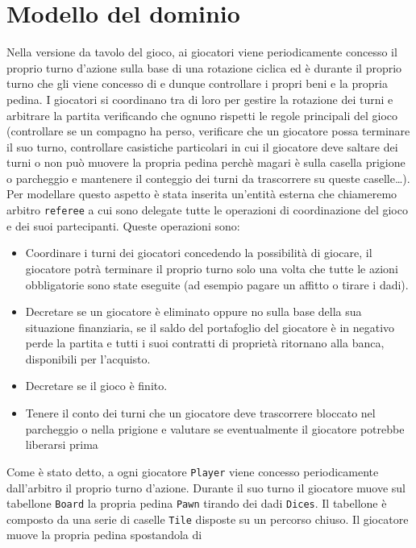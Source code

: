 \section{Modello del dominio}
Nella versione da tavolo del gioco, ai giocatori viene periodicamente concesso il proprio turno d'azione 
sulla base di una rotazione ciclica ed è durante il proprio turno che gli viene concesso di  e dunque
controllare i propri beni e la propria pedina.
I giocatori si coordinano tra di loro
per gestire la rotazione dei turni e arbitrare la partita verificando che ognuno rispetti le 
regole principali del gioco (controllare se un compagno ha perso, verificare che un giocatore possa terminare il suo turno, controllare casistiche particolari
in cui il giocatore deve saltare dei turni o non può muovere la propria pedina perchè magari è sulla casella prigione
o parcheggio e mantenere il conteggio dei turni da trascorrere su queste caselle\dots).\newline
Per modellare questo aspetto è stata inserita un'entità esterna che chiameremo arbitro \texttt{referee} a cui sono delegate
tutte le operazioni di coordinazione del gioco e dei suoi partecipanti. 
Queste operazioni sono:
\begin{itemize}
    \item
    Coordinare i turni dei giocatori concedendo la possibilità di giocare, 
    il giocatore potrà terminare il proprio turno solo una volta che tutte le azioni obbligatorie sono state eseguite 
    (ad esempio pagare un affitto o tirare i dadi).
    \item 
    Decretare se un giocatore è eliminato oppure no sulla base della sua situazione finanziaria,
    se il saldo del portafoglio del giocatore è in negativo perde la partita e tutti i suoi contratti di proprietà
    ritornano alla banca, disponibili per l’acquisto. 
    \item
    Decretare se il gioco è finito.
    \item Tenere il conto dei turni che un giocatore deve trascorrere bloccato nel parcheggio o nella prigione e valutare se 
    eventualmente il giocatore potrebbe liberarsi prima
\end{itemize}
Come è stato detto, a ogni giocatore \texttt{Player} viene concesso periodicamente dall'arbitro il proprio turno d’azione.
Durante il suo turno il giocatore muove sul tabellone \texttt{Board} la propria pedina \texttt{Pawn} tirando dei dadi \texttt{Dices}.
Il tabellone è composto da una serie di caselle  \texttt{Tile} disposte su un percorso chiuso. Il giocatore muove la propria pedina spostandola di 
